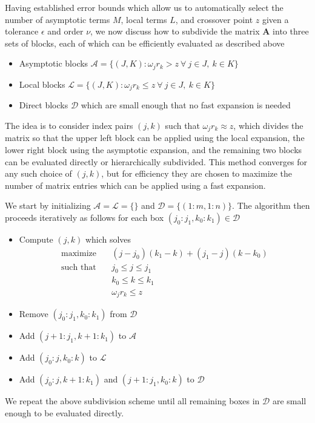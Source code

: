 Having established error bounds which allow us to automatically select the
number of asymptotic terms $M$, local terms $L$, and crossover point $z$ given a
tolerance $\epsilon$ and order $\nu$, we now discuss how to subdivide the matrix
$\bm{A}$ into three sets of blocks, each of which can be efficiently evaluated
as described above
\begin{itemize}
    \item Asymptotic blocks $\mathscr{A} = \big\{ (J, K) : \omega_j r_k > z \
    \forall \ j \in J, \ k \in K \big\}$
    \item Local blocks $\mathscr{L} = \big\{ (J, K) : \omega_j r_k \leq z \
    \forall \ j \in J, \ k \in K \big\}$
    \item Direct blocks $\mathscr{D}$ which are small enough that no fast
    expansion is needed
\end{itemize}
The idea is to consider index pairs $(j,k)$ such that $\omega_j r_k \approx z$,
which divides the matrix so that the upper left block can be applied using the
local expansion, the lower right block using the asymptotic expansion, and the
remaining two blocks can be evaluated directly or hierarchically subdivided.
This method converges for any such choice of $(j,k)$, but for efficiency they
are chosen to maximize the number of matrix entries which can be applied using a
fast expansion.

We start by initializing $\mathscr{A} = \mathscr{L} = \{\}$ and $\mathscr{D} =
\{(1:m, 1:n)\}$. The algorithm then proceeds iteratively as follows for each box
$(j_0:j_1, k_0:k_1) \in \mathscr{D}$
\begin{itemize}
    \item Compute $(j,k)$ which solves
    \begin{align}
        \text{maximize} &\quad (j-j_0)(k_1-k) + (j_1-j)(k-k_0) \\
        \text{such that} &\quad j_0 \leq j \leq j_1 \nonumber \\ 
        &\quad k_0 \leq k \leq k_1 \nonumber \\ 
        &\quad \omega_j r_k \leq z \nonumber
    \end{align}
    \item Remove $(j_0:j_1, k_0:k_1)$ from $\mathscr{D}$
    \item Add $(j+1:j_1, k+1:k_1)$ to $\mathscr{A}$ 
    \item Add $(j_0:j, k_0:k)$ to $\mathscr{L}$ 
    \item Add $(j_0:j, k+1:k_1)$ and $(j+1:j_1, k_0:k)$ to $\mathscr{D}$ 
\end{itemize}
We repeat the above subdivision scheme until all remaining boxes in
$\mathscr{D}$ are small enough to be evaluated directly.

